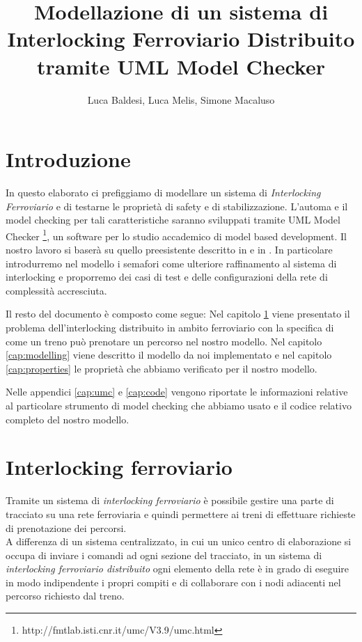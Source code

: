 \documentclass[10pt,a4paper,oneside]{report}
\author{Luca Baldesi, Luca Melis, Simone Macaluso}
\title{Modellazione di un sistema di
Interlocking Ferroviario Distribuito
tramite UML Model Checker
}
\begin{document}
\maketitle
\tableofcontents
\chapter*{Introduzione}
In questo elaborato ci prefiggiamo di modellare un sistema di \emph{Interlocking Ferroviario} e di testarne le proprietà di safety e di stabilizzazione. L'automa e il model checking per tali caratteristiche saranno sviluppati tramite UML Model Checker \footnote{http://fmtlab.isti.cnr.it/umc/V3.9/umc.html}, un software per lo studio accademico di model based development. Il nostro lavoro si baserà su quello preesistente descritto in \cite{Paolieri} e in \cite{RossettoRocciolo}. In particolare introdurremo nel modello i semafori come ulteriore raffinamento al sistema di interlocking e proporremo dei casi di test e delle configurazioni della rete di complessità accresciuta.

Il resto del documento è composto come segue:
Nel capitolo \ref{cap:interlocking} viene presentato il problema dell'interlocking distribuito in ambito ferroviario con la specifica di come un treno può prenotare un percorso nel nostro modello. Nel capitolo \ref{cap:modelling} viene descritto il modello da noi implementato e nel capitolo \ref{cap:properties} le proprietà che abbiamo verificato per il nostro modello.

Nelle appendici \ref{cap:umc} e \ref{cap:code} vengono riportate le informazioni relative al particolare strumento di model checking che abbiamo usato e il codice relativo completo del nostro modello.
\chapter{Interlocking ferroviario}
\label{cap:interlocking}
Tramite un sistema di \textit{interlocking ferroviario} è possibile gestire una parte di tracciato su una rete ferroviaria e quindi permettere ai treni di effettuare richieste di prenotazione dei percorsi.\\
A differenza di un sistema centralizzato, in cui un unico centro di elaborazione si occupa di inviare i comandi ad ogni sezione del tracciato, in un sistema di \textit{interlocking ferroviario distribuito} ogni elemento della rete è in grado di eseguire in modo indipendente i propri compiti e di collaborare con i nodi adiacenti nel percorso richiesto dal treno.
\end{document}
